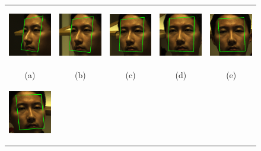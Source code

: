 \documentclass[12pt,journal,draftcls,letterpaper,onecolumn]{IEEEtran}
\providecommand{\DIFaddbeginFL}{} %
\providecommand{\DIFaddendFL}{} %
\providecommand{\DIFdelbeginFL}{} %
\providecommand{\DIFdelendFL}{} %
\begin{document}
\begin{figure}
\centering
\DIFaddbeginFL {\small
\DIFaddendFL \begin{tabular}{ccccc}
\includegraphics[height=1in]{figures_cvpr/5} &
\includegraphics[height=1in]{figures_cvpr/7} &
\includegraphics[height=1in]{figures_cvpr/09} &
\includegraphics[height=1in]{figures_cvpr/11} &
\includegraphics[height=1in]{figures_cvpr/13} \DIFdelbeginFL %
\DIFdelendFL \vspace{-.1in} \DIFaddbeginFL \\ 
\DIFaddendFL (a) & (b) & (c) & (d) & (e)\DIFdelbeginFL %
\DIFdelendFL \\
\includegraphics[height=1in]{figures_cvpr/15} &

\end{tabular}}
\end{figure}
\end{document}
